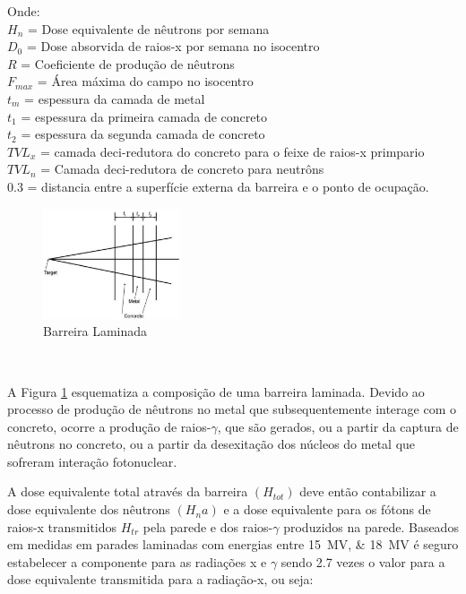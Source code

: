 \documentclass[11pt,a4paper]{article}
\begin{document}
            Onde: \\
            $H_n$ =  Dose equivalente de nêutrons por semana \\
            $D_0$ =  Dose absorvida de raios-x por semana no isocentro \\
            $R$ = Coeficiente de produção de nêutrons \\
            $F_{max}$ = Área máxima do campo no isocentro \\
            $t_m$ = espessura da camada de metal \\
            $t_1$ = espessura da primeira camada de concreto \\
            $t_2$ = espessura da segunda camada de concreto \\
            $TVL_x$ = camada deci-redutora do concreto para o feixe de raios-x primpario \\
            $TVL_n$ = Camada deci-redutora de concreto para neutrôns \\
            $0.3$ = distancia entre a superfície externa da barreira e o ponto de ocupação.


            \begin{figure}
                \centering
                \includegraphics[width=0.36\textwidth]{Imagens/esquemaBarreiraLaminada.JPG}
                \caption{Barreira Laminada}
                \label{fig:esquemaBarreiraLaminada}
            \end{figure}
            
            \

            A Figura \ref{fig:esquemaBarreiraLaminada} esquematiza a composição de uma barreira laminada. Devido ao processo de produção de nêutrons no metal que subsequentemente interage com o concreto, ocorre a produção de raios-$\gamma$, que são gerados, ou a partir da captura de nêutrons no concreto, ou a partir da desexitação dos núcleos do metal que sofreram interação fotonuclear.

            A dose equivalente total através da barreira $(H_{tot})$ deve então contabilizar a dose equivalente dos nêutrons $(H_na)$ e a dose equivalente para os fótons de raios-x transmitidos $ H_{tr}$ pela parede e dos raios-$\gamma$ produzidos na parede. Baseados em medidas em parades laminadas com energias entre \qtylist{15; 18}{MV} é seguro estabelecer a componente para as radiações x e $\gamma$ sendo 2.7 vezes o valor para a dose equivalente transmitida para a radiação-x, ou seja:
\end{document}

